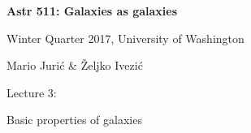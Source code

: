 \documentclass[letterpaper,landscape]{slides}
\begin{document}
\newcommand{\Spicslide}[7]{%
  \begin{slide}
     \begin{center}
        \begin{minipage}{#5in}
            \vskip #6in
            \hskip #7in
            {\scalebox{#4}{\texttt{[image: \#1.\#2]}}}
        \end{minipage}
     \end{center}
     \vfill
  \end{slide}
}
 
\newcommand{\onepic}[6]{%
\begin{slide}
     \begin{center}
        \begin{minipage}{#1in}
            {\large \color{blue} #6}
            \phantom{x} \vskip #2in
            \phantom{x} \hskip #3in
            {\scalebox{#4}{\texttt{[image: \#5]}}}   
        \end{minipage}
     \end{center}
    \vfill
\end{slide}
}

\newcommand{\smgraphicsZI}[7]{
   \begin{minipage}[t]{#6in}
     \vskip#3in \hskip#4in
     \scalebox{#5}{\texttt{[image: \#1.\#2]}}
   \end{minipage}}


\newcommand{\palV}[2]{
\begin{slide}

\begin{minipage}{8in}
~\vskip-1in
\rotatebox{0}{\scalebox{0.85}{\texttt{[image: \#1]}}}
\vskip -2.5in~
\end{minipage}

#2

\vfill
\end{slide}
}



\begin{slide}

\phantom{x}
\vskip -2in
\begin{center}
\bfseries
{\large {\color{blue} Astr 511: Galaxies as galaxies}}
\end{center}

{\centerline {{\color{blue} 
Winter Quarter 2017, University of Washington}}}
{\centerline {{\color{blue} 
Mario Juri\'{c} \& \v{Z}eljko Ivezi\'{c} }}}

\vskip 1.6in

{\centerline {\huge {\color{red}      Lecture 3:             }}}
\vskip 0.2in 
{\centerline {\Large {\color{blue} Basic properties of galaxies }}}

\vfill
\end{slide}
\end{document}
